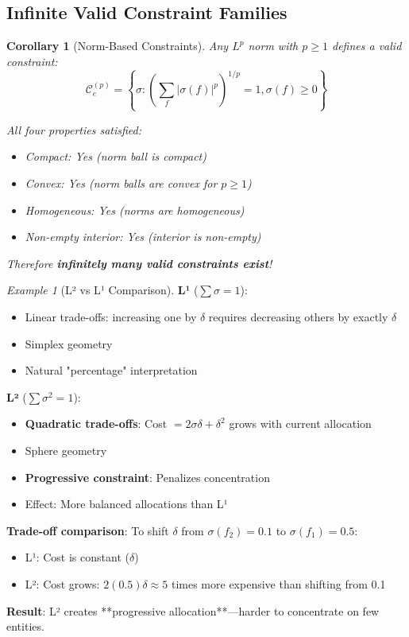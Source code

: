 \documentclass[11pt,a4paper]{article}
\newtheorem{corollary}[theorem]{Corollary}
\theoremstyle{definition}
\theoremstyle{remark}
\newtheorem{example}[theorem]{Example}
\newcommand{\C}{\mathcal{C}}
\begin{document}
\subsection{Infinite Valid Constraint Families}

\begin{corollary}[Norm-Based Constraints]
Any $L^p$ norm with $p \ge 1$ defines a valid constraint:
\[ \C_e^{(p)} = \left\{\sigma : \left(\sum_f |\sigma(f)|^p\right)^{1/p} = 1, \sigma(f) \ge 0\right\} \]

All four properties satisfied:
\begin{itemize}
\item Compact: Yes (norm ball is compact)
\item Convex: Yes (norm balls are convex for $p \ge 1$)
\item Homogeneous: Yes (norms are homogeneous)
\item Non-empty interior: Yes (interior is non-empty)
\end{itemize}

Therefore \textbf{infinitely many valid constraints exist}!
\end{corollary}

\begin{example}[L² vs L¹ Comparison]
\textbf{L¹} ($\sum \sigma = 1$):
\begin{itemize}
\item Linear trade-offs: increasing one by $\delta$ requires decreasing others by exactly $\delta$
\item Simplex geometry
\item Natural "percentage" interpretation
\end{itemize}

\textbf{L²} ($\sum \sigma^2 = 1$):
\begin{itemize}
\item \textbf{Quadratic trade-offs}: Cost $= 2\sigma\delta + \delta^2$ grows with current allocation
\item Sphere geometry
\item \textbf{Progressive constraint}: Penalizes concentration
\item Effect: More balanced allocations than L¹
\end{itemize}

\textbf{Trade-off comparison}: To shift $\delta$ from $\sigma(f_2)=0.1$ to $\sigma(f_1)=0.5$:
\begin{itemize}
\item L¹: Cost is constant ($\delta$)
\item L²: Cost grows: $2(0.5)\delta \approx 5$ times more expensive than shifting from 0.1
\end{itemize}

\textbf{Result}: L² creates **progressive allocation**—harder to concentrate on few entities.
\end{example}
\end{document}
